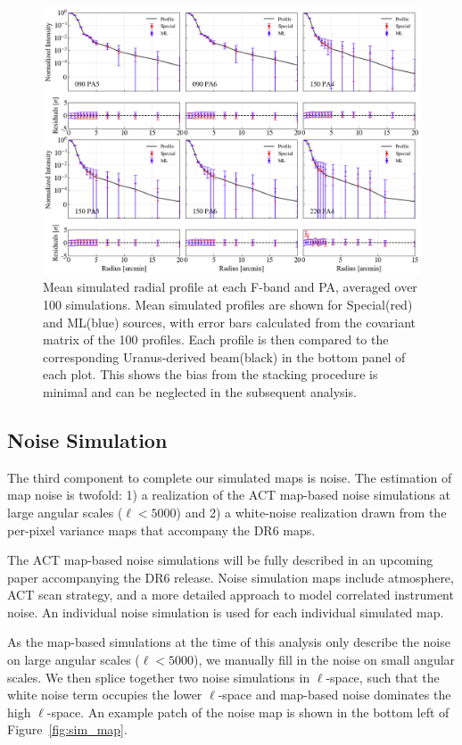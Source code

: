 \begin{figure}[t]
    \centering
    \includegraphics[width=\textwidth]{Figures/profiles_sims.png}
    \caption{Mean simulated radial profile at each F-band and PA, averaged over 100 simulations.  Mean simulated profiles are shown for Special(red) and ML(blue) sources, with error bars calculated from the covariant matrix of the 100 profiles.  Each profile is then compared to the corresponding Uranus-derived beam(black) in the bottom panel of each plot.  This shows the bias from the stacking procedure is minimal and can be neglected in the subsequent analysis.}
    \label{fig:simprofs}
\end{figure}

\subsection{Noise Simulation}
\label{subsec:sim_noise}
The third component to complete our simulated maps is noise.  The estimation of map noise is twofold: 1) a realization of the ACT map-based noise simulations at large angular scales ($\ell<5000$) and 2) a white-noise realization drawn from the per-pixel variance maps that accompany the DR6 maps.

The ACT map-based noise simulations will be fully described in an upcoming paper accompanying the DR6 release. Noise simulation maps include atmosphere, ACT scan strategy, and a more detailed approach to model correlated instrument noise.  An individual noise simulation is used for each individual simulated map.

As the map-based simulations at the time of this analysis only describe the noise on large angular scales ($\ell<5000$), we manually fill in the noise on small angular scales.  We then splice together two noise simulations in $\ell$-space, such that the white noise term occupies the lower $\ell$-space and map-based noise dominates the high $\ell$-space.  An example patch of the noise map is shown in the bottom left of Figure~\ref{fig:sim_map}.

